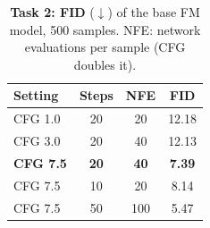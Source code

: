 \begin{table}[t]
  \centering
  \footnotesize
  \caption{\textbf{Task 2: FID} ($\downarrow$) of the base FM model, 500 samples. NFE: network evaluations per sample (CFG doubles it).}
  \label{tab:task2}
  \begin{tabular}{@{}lccc@{}}
    \toprule
    Setting & Steps & NFE & FID \\
    \midrule
    CFG 1.0 & 20 & 20  & 12.18 \\
    CFG 3.0 & 20 & 40  & 12.13 \\
    \textbf{CFG 7.5} & \textbf{20} & \textbf{40} & \textbf{7.39} \\
    \midrule
    CFG 7.5 & 10 & 20  & 8.14 \\
    CFG 7.5 & 50 & 100 & 5.47 \\
    \bottomrule
  \end{tabular}
\end{table}

